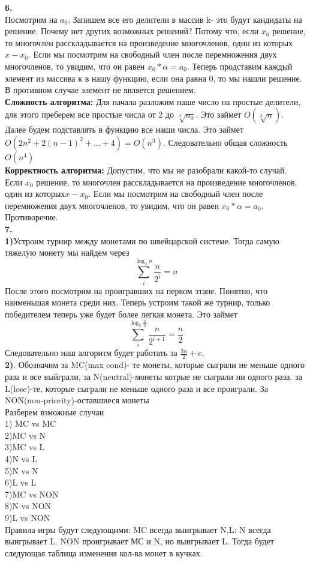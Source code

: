 \documentclass[a4paper,12pt]{article}
\begin{document}
\textbf{6.}\\
Посмотрим на $a_0$. Запишем все его делители в массив k- это будут кандидаты на решение. Почему нет других возможных решений? Потому что, если $x_0$ решение, то многочлен расскладывается на произведение многочленов, один из которых$x-x_0$. Если мы посмотрим  на свободный член после перемножения двух многочленов, то увидим, что он равен $x_0*\alpha=a_0$. Теперь продставим каждый элемент из массива к в нашу функцию, если она равна 0, то мы нашли решение. В противном случае элемент не является решением.\\
\textbf{Сложность алгоритма:} Для начала разложим наше число на простые делители, для этого преберем все простые числа от 2 до $\sqrt[2]{a_0}$. Это займет $O(\sqrt[2]{n})$. Далее будем подставлять в функцию все наши числа. Это займет $O(2n^2+2(n-1)^2+...+4)=O(n^3)$. Следовательно общая сложность $O(n^4)$\\
\textbf{Корректность алгоритма:} Допустим, что мы не разобрали какой-то случай. Если $x_0$ решение, то многочлен расскладывается на произведение многочленов, один из которых$x-x_0$. Если мы посмотрим  на свободный член после перемножения двух многочленов, то увидим, что он равен $x_0*\alpha=a_0$. Противоречие.\\
\textbf{7.}\\
\textbf{1)}Устроим турнир между монетами по швейцарской системе. Тогда самую тяжелую монету мы найдем через \[\sum_i^{\log_2 n} \frac{n}{2^i}=n\]
После этого посмотрим на проигравших на первом этапе. Понятно, что наименьшая монета среди них. Теперь устроим такой же турнир, только победителем теперь уже будет более легкая монета. Это займет 
\[\sum_i^{\log_2 \frac{n}{2}} \frac{n}{2^{i+1}}=\frac{n}{2}\] 
Следовательно наш алгоритм будет работать за $\frac{3n}{2}+c$.\\
\textbf{2)}. Обозначим за MC(max cond)- те монеты, которые сыграли не меньше одного раза и все выйграли, за N(neutral)-монеты котрые не сыграли ни одного раза. за L(lose)-те, которые сыграли не меньше одного раза и все проиграли. За NON(non-priority)-оставшиеся монеты\\
Разберем взможные случаи\\
1) MC vs MC\\
2)MC vs N\\
3)MC vs L\\
4)N vs L\\
5)N vs N\\
6)L vs L\\
7)MC vs NON\\
8)N vs NON\\
9)L vs NON\\
Правила  игры будут следующими: MC всегда выигрывает N,L: N всегда выигрывает L. NON проигрывает МС и N, но выигрывает L.
Тогда будет следующая таблица изменения кол-ва монет в кучках.\\
\end{document}
